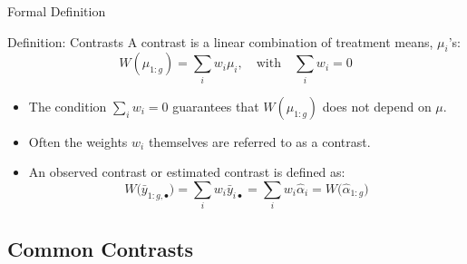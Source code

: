 \begin{frame}[allowframebreaks]{Formal Definition}

\begin{block}{Definition: Contrasts}
  A contrast is a linear combination of treatment means, $\mu_{i}$'s:
  $$
  W(\mu_{1:g}) = \sum_{i} w_i \mu_i, \quad \text{with} \quad \sum_i w_i = 0
  $$
\end{block}
  \begin{itemize}
    \item The condition $\sum_i w_i = 0$ guarantees that $W(\mu_{1:g})$ does not depend on $\mu$.
    
    
    \framebreak
    
    \item Often the weights $w_i$ themselves are referred to as a contrast.
    \item An \alert{observed} contrast or estimated contrast is defined as:
    $$
    W\big(\bar{y}_{1:g, \bullet}\big) = \sum_i w_i \bar{y}_{i\bullet} = \sum_i w_i \hat{\alpha}_i = W\big(\hat{\alpha}_{1:g}\big)
    $$
  \end{itemize}
\end{frame}

\subsection{Common Contrasts}

